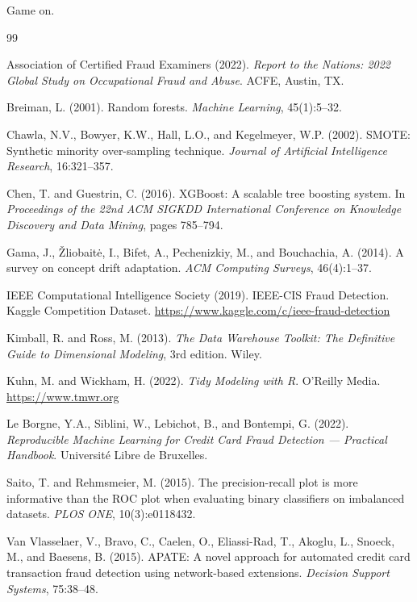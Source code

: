 \documentclass[12pt, a4paper]{article}
\begin{document}
Game on.

\newpage

\begin{thebibliography}{99}

Association of Certified Fraud Examiners (2022).
\textit{Report to the Nations: 2022 Global Study on Occupational Fraud and Abuse}.
ACFE, Austin, TX.

Breiman, L. (2001).
Random forests.
\textit{Machine Learning}, 45(1):5--32.

Chawla, N.V., Bowyer, K.W., Hall, L.O., and Kegelmeyer, W.P. (2002).
SMOTE: Synthetic minority over-sampling technique.
\textit{Journal of Artificial Intelligence Research}, 16:321--357.

Chen, T. and Guestrin, C. (2016).
XGBoost: A scalable tree boosting system.
In \textit{Proceedings of the 22nd ACM SIGKDD International Conference on
Knowledge Discovery and Data Mining}, pages 785--794.

Gama, J., \v{Z}liobait\.{e}, I., Bifet, A., Pechenizkiy, M., and Bouchachia, A.
(2014).
A survey on concept drift adaptation.
\textit{ACM Computing Surveys}, 46(4):1--37.

IEEE Computational Intelligence Society (2019).
IEEE-CIS Fraud Detection.
Kaggle Competition Dataset.
\url{https://www.kaggle.com/c/ieee-fraud-detection}

Kimball, R. and Ross, M. (2013).
\textit{The Data Warehouse Toolkit: The Definitive Guide to Dimensional Modeling},
3rd edition. Wiley.

Kuhn, M. and Wickham, H. (2022).
\textit{Tidy Modeling with R}. O'Reilly Media.
\url{https://www.tmwr.org}

Le Borgne, Y.A., Siblini, W., Lebichot, B., and Bontempi, G. (2022).
\textit{Reproducible Machine Learning for Credit Card Fraud Detection ---
Practical Handbook}.
Universit\'{e} Libre de Bruxelles.

Saito, T. and Rehmsmeier, M. (2015).
The precision-recall plot is more informative than the ROC plot when evaluating
binary classifiers on imbalanced datasets.
\textit{PLOS ONE}, 10(3):e0118432.

Van Vlasselaer, V., Bravo, C., Caelen, O., Eliassi-Rad, T., Akoglu, L.,
Snoeck, M., and Baesens, B. (2015).
APATE: A novel approach for automated credit card transaction fraud detection
using network-based extensions.
\textit{Decision Support Systems}, 75:38--48.

\end{thebibliography}
\end{document}
